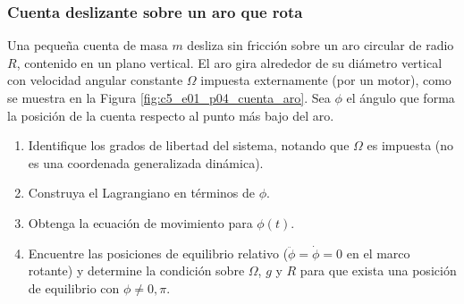 \subsubsection{Cuenta deslizante sobre un aro que rota}

Una pequeña cuenta de masa $m$ desliza sin fricción sobre un aro circular de radio $R$, contenido en un plano vertical. El aro gira alrededor de su diámetro vertical con velocidad angular constante $\Omega$ impuesta externamente (por un motor), como se muestra en la Figura \ref{fig:c5_e01_p04_cuenta_aro}. Sea $\phi$ el ángulo que forma la posición de la cuenta respecto al punto más bajo del aro.

\begin{enumerate}
    \item Identifique los grados de libertad del sistema, notando que $\Omega$ es impuesta (no es una coordenada generalizada dinámica).
    \item Construya el Lagrangiano en términos de $\phi$.
    \item Obtenga la ecuación de movimiento para $\phi(t)$.
    \item Encuentre las posiciones de equilibrio relativo ($\ddot\phi = \dot\phi = 0$ en el marco rotante) y determine la condición sobre $\Omega$, $g$ y $R$ para que exista una posición de equilibrio con $\phi \neq 0, \pi$.
\end{enumerate}

